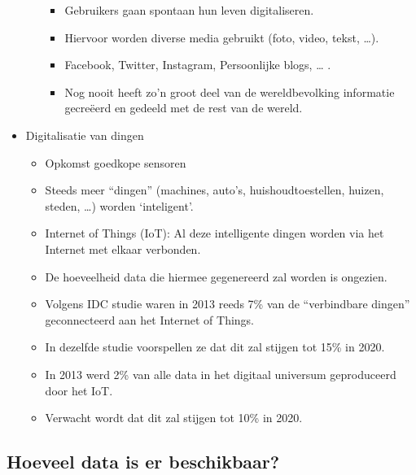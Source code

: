 \documentclass[]{tufte-book}
\providecommand{\tightlist}{%
  \setlength{\itemsep}{0pt}\setlength{\parskip}{0pt}}
\begin{document}
\begin{itemize}
\begin{itemize}
    \begin{itemize}
    \tightlist
    \item
      Gebruikers gaan spontaan hun leven digitaliseren.
    \item
      Hiervoor worden diverse media gebruikt (foto, video, tekst, \ldots).
    \item
      Facebook, Twitter, Instagram, Persoonlijke blogs, \ldots{} .
    \item
      Nog nooit heeft zo'n groot deel van de wereldbevolking informatie gecreëerd en gedeeld met de rest van de wereld.
    \end{itemize}
  \end{itemize}
\item
  Digitalisatie van dingen

  \begin{itemize}
  \tightlist
  \item
    Opkomst goedkope sensoren
  \item
    Steeds meer ``dingen'' (machines, auto's, huishoudtoestellen, huizen, steden, \ldots) worden `inteligent'.
  \item
    Internet of Things (IoT): Al deze intelligente dingen worden via het Internet met elkaar verbonden.
  \item
    De hoeveelheid data die hiermee gegenereerd zal worden is ongezien.
  \item
    Volgens IDC studie waren in 2013 reeds 7\% van de ``verbindbare dingen'' geconnecteerd aan het Internet of Things.
  \item
    In dezelfde studie voorspellen ze dat dit zal stijgen tot 15\% in 2020.
  \item
    In 2013 werd 2\% van alle data in het digitaal universum geproduceerd door het IoT.
  \item
    Verwacht wordt dat dit zal stijgen tot 10\% in 2020.
  \end{itemize}
\end{itemize}

\hypertarget{hoeveel-data-is-er-beschikbaar}{%
\subsection{Hoeveel data is er beschikbaar?}\label{hoeveel-data-is-er-beschikbaar}}
\end{document}

